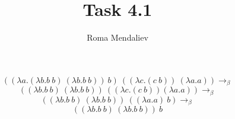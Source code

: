 \documentclass[12pt]{article}
\title{Task 4.1}
\author{Roma Mendaliev}
\date{}
\begin{document}
\maketitle

$$((\lambda a.(\lambda b.b\ b)\ (\lambda b.b\ b))\ b)\ ((\lambda c.(c\ b))\ (\lambda a.a)) \rightarrow_\beta$$
$$((\lambda b.b\ b)\ (\lambda b.b\ b))\ ((\lambda c.(c\ b)) (\lambda a.a)) \rightarrow_\beta$$
$$((\lambda b.b\ b)\ (\lambda b.b\ b))\ ((\lambda a.a)\ b) \rightarrow_\beta$$
$$((\lambda b.b\ b)\ (\lambda b.b\ b))\ b$$
\end{document}
